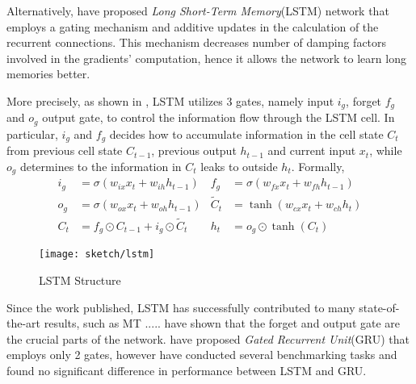 Alternatively,\cite{HochreiterLongshorttermmemory1997} have proposed \textit{Long Short-Term Memory}(LSTM) network that employs a gating mechanism and additive updates in the calculation of the recurrent connections. This mechanism decreases number of damping factors involved in the gradients' computation, hence it allows the network to learn long memories better.

More precisely, as shown in \addfigure{\ref{fig:lstm_structure}}, LSTM utilizes 3 gates, namely input $i_g$, forget $f_g$ and $o_g$ output gate, to control the information flow through the LSTM cell. In particular, $i_g$ and $f_g$ decides how to accumulate information in the cell state $C_t$ from previous cell state $C_{t-1}$, previous output $h_{t-1}$ and current input $x_t$, while $o_g$ determines to the information in $C_t$ leaks to outside $h_t$. Formally, 
\begin{align}
	i_g &= \sigma( w_{ix} x_t + w_{ih} h_{t-1} )  &  	f_g &= \sigma( w_{fx} x_t + w_{fh} h_{t-1} )\\
	o_g &= \sigma( w_{ox} x_t + w_{oh} h_{t-1} ) & \widetilde{C}_t &= \tanh(w_{cx} x_t + w_{ch} h_t) \\
	C_t &= f_g \odot C_{t-1} + i_g \odot \widetilde{C}_t & h_{t} &= o_g \odot\tanh(C_t)
\end{align}


\begin{figure}[h]
\centering
\texttt{[image: sketch/lstm]}
\caption{LSTM Structure} 

\label{fig:lstm_structure} 
\end{figure}

Since the work published, LSTM has successfully contributed to many state-of-the-art results, such as MT ..... \cite{GreffLSTMsearchspace2017} have shown that the forget and output gate are the crucial parts of the network.  \cite{ChoLearningPhraseRepresentations2014a} have proposed \textit{Gated Recurrent Unit}(GRU) that employs only 2 gates, however \cite{Jozefowiczempiricalexplorationrecurrent2015a} have conducted several benchmarking tasks and found no significant difference in performance between LSTM and GRU. 